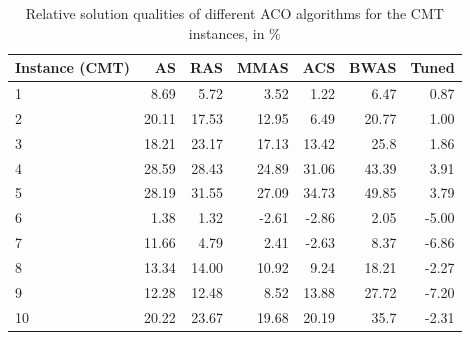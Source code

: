 \documentclass[11pt,a4paper,oneside]{book}
\begin{document}
\begin{table}[]
\centering
\caption{Relative solution qualities of different ACO algorithms for the CMT instances, in \%}
\label{tbl:benchmark}
\begin{tabular}{|l|r|r|r|r|r|r|}
\hline
\textbf{Instance (CMT)} & \textbf{AS} & \textbf{RAS} &\textbf{MMAS} & \textbf{ACS} & \textbf{BWAS} & \textbf{Tuned} \\ \hline
1                            & 8.69                  & 5.72                   & 3.52                    & 1.22                   & 6.47                    & 0.87                     \\ \hline
2                            & 20.11                 & 17.53                  & 12.95                   & 6.49                   & 20.77                   & 1.00                        \\ \hline
3                            & 18.21                 & 23.17                  & 17.13                   & 13.42                  & 25.8                    & 1.86                     \\ \hline
4                            & 28.59                 & 28.43                  & 24.89                   & 31.06                  & 43.39                   & 3.91                     \\ \hline
5                            & 28.19                 & 31.55                  & 27.09                   & 34.73                  & 49.85                   & 3.79                     \\ \hline
6                            & 1.38                  & 1.32                   & -2.61                   & -2.86                  & 2.05                    & -5.00                       \\ \hline
7                            & 11.66                 & 4.79                   & 2.41                    & -2.63                  & 8.37                    & -6.86                    \\ \hline
8                            & 13.34                 & 14.00                     & 10.92                   & 9.24                   & 18.21                   & -2.27                    \\ \hline
9                            & 12.28                 & 12.48                  & 8.52                    & 13.88                  & 27.72                   & -7.20                     \\ \hline
10                           & 20.22                 & 23.67                  & 19.68                   & 20.19                  & 35.7                    & -2.31                    \\ \hline

\end{tabular}
\end{table}
\end{document}
